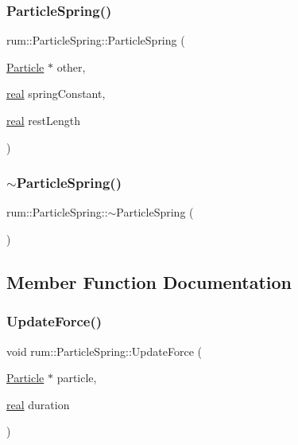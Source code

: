 \subsubsection{\texorpdfstring{Particle\+Spring()}{ParticleSpring()}}
{\footnotesize\ttfamily rum\+::\+Particle\+Spring\+::\+Particle\+Spring (\begin{DoxyParamCaption}\item[{\hyperlink{classrum_1_1_particle}{Particle} $\ast$}]{other,  }\item[{\hyperlink{namespacerum_a7e8cca23573d5eaead0f138cbaa4862c}{real}}]{spring\+Constant,  }\item[{\hyperlink{namespacerum_a7e8cca23573d5eaead0f138cbaa4862c}{real}}]{rest\+Length }\end{DoxyParamCaption})}

\mbox{\label{classrum_1_1_particle_spring_ac48ba65487b023ea754b4e0e8a33dafc}} 
\subsubsection{\texorpdfstring{$\sim$\+Particle\+Spring()}{~ParticleSpring()}}
{\footnotesize\ttfamily rum\+::\+Particle\+Spring\+::$\sim$\+Particle\+Spring (\begin{DoxyParamCaption}{ }\end{DoxyParamCaption})}



\subsection{Member Function Documentation}
\mbox{\label{classrum_1_1_particle_spring_aed78e527b0a96a392fe5d9e1ffa50ca6}} 
\subsubsection{\texorpdfstring{Update\+Force()}{UpdateForce()}}
{\footnotesize\ttfamily void rum\+::\+Particle\+Spring\+::\+Update\+Force (\begin{DoxyParamCaption}\item[{\hyperlink{classrum_1_1_particle}{Particle} $\ast$}]{particle,  }\item[{\hyperlink{namespacerum_a7e8cca23573d5eaead0f138cbaa4862c}{real}}]{duration }\end{DoxyParamCaption})\hspace{0.3cm}{\ttfamily [virtual]}}



